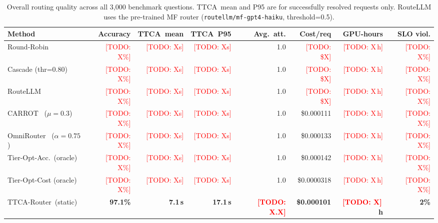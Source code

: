 \documentclass[11pt]{article}
\newcommand{\sysname}{TTCA-Router\xspace}
\newcommand{\ttca}{\textsc{TTCA}\xspace}
\newcommand{\result}[1]{\textbf{#1}}
\newcommand{\todo}[1]{\textcolor{red}{[TODO: #1]}}
\begin{document}
\begin{table}[t]
  \centering
  \caption{%
    Overall routing quality across all 3{,}000 benchmark questions.
    \ttca\ mean and P95 are for successfully resolved requests only.
    RouteLLM uses the pre-trained MF router
    (\texttt{routellm/mf-gpt4-haiku}, threshold=0.5).%
  }
  \label{tab:routing}
  \small
  \begin{tabular}{lrrrrrrr}
    \toprule
    Method & Accuracy & \ttca\ mean & \ttca\ P95 & Avg.\ att. & Cost/req & GPU-hours & SLO viol. \\
    \midrule
    Round-Robin                                    & \todo{X\%} & \todo{Xs} & \todo{Xs} & 1.0 & \todo{\$X} & \todo{X\,h} & \todo{X\%} \\
    Cascade (thr=0.80)                             & \todo{X\%} & \todo{Xs} & \todo{Xs} & 1.0 & \todo{\$X} & \todo{X\,h} & \todo{X\%} \\
    RouteLLM~\cite{ong2024routellm}                & \todo{X\%} & \todo{Xs} & \todo{Xs} & 1.0 & \todo{\$X} & \todo{X\,h} & \todo{X\%} \\
    CARROT~\cite{somerstep2025carrot} ($\mu{=}0.3$) & \todo{X\%} & \todo{Xs} & \todo{Xs} & 1.0 & \$0.000111 & \todo{X\,h} & \todo{X\%} \\
    OmniRouter~\cite{mei2025omnirouter} ($\alpha{=}0.75$) & \todo{X\%} & \todo{Xs} & \todo{Xs} & 1.0 & \$0.000133 & \todo{X\,h} & \todo{X\%} \\
    Tier-Opt-Acc.\ (oracle)                        & \todo{X\%} & \todo{Xs} & \todo{Xs} & 1.0 & \$0.000142 & \todo{X\,h} & \todo{X\%} \\
    Tier-Opt-Cost (oracle)                         & \todo{X\%} & \todo{Xs} & \todo{Xs} & 1.0 & \$0.0000318 & \todo{X\,h} & \todo{X\%} \\
    \midrule
    \sysname\ (static)                             & \result{97.1\%} & \result{7.1\,s} & \result{17.1\,s} & \result{\todo{X.X}} & \result{\$0.000101} & \result{\todo{X}\,h} & \result{2\%} \\
    \bottomrule
  \end{tabular}
\end{table}
\end{document}

